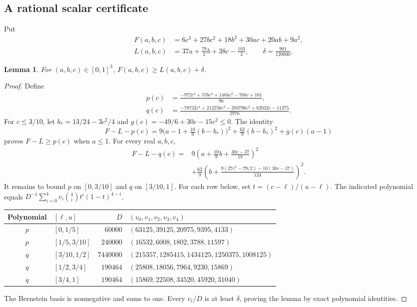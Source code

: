 \documentclass[11pt]{article}
\newtheorem{lemma}[theorem]{Lemma}
\theoremstyle{remark}
\begin{document}
\subsection{A rational scalar certificate}
Put
\begin{align*}
 F(a,b,c)&=6c^3+27bc^2+18b^2+30ac+20ab+9a^2,\\
 L(a,b,c)&=37a+\frac{79}{2}b+38c-\frac{103}{3},\qquad
 \delta=\frac{901}{120000}.
\end{align*}
\begin{lemma}\label{lem:minorant}
For $(a,b,c)\in[0,1]^3$, $F(a,b,c)\ge L(a,b,c)+\delta$.
\end{lemma}
\begin{proof}
Define
\begin{align*}
 p(c)&=\frac{-972c^4+576c^3+1404c^2-768c+101}{96},\\
 q(c)&=\frac{-78732c^4+212256c^3-203796c^2+82032c-11275}{2976}.
\end{align*}
For $c\le3/10$, let $b_*=13/24-3c^2/4$ and
$g(c)=-49/6+30c-15c^2\le0$. The identity
\[
 F-L-p(c)=9\bigl(a-1+\tfrac{10}{9}(b-b_*)\bigr)^2
       +\tfrac{62}{9}(b-b_*)^2+g(c)(a-1)
\]
proves $F-L\ge p(c)$ when $a\le1$. For every real $a,b,c$,
\begin{align*}
 F-L-q(c)={}&9\left(a+\tfrac{10}{9}b+\tfrac{30c-37}{18}\right)^2\\
 &+\frac{62}{9}\left(b+
 \frac{9(27c^2-79/2)-10(30c-37)}{124}\right)^2.
\end{align*}
It remains to bound $p$ on $[0,3/10]$ and $q$ on $[3/10,1]$.
For each row below, set $t=(c-\ell)/(u-\ell)$. The indicated polynomial
equals $D^{-1}\sum_{i=0}^4v_i\binom4i t^i(1-t)^{4-i}$.
\begin{center}\small
\begin{tabular}{clrl}
\toprule
Polynomial & $[\ell,u]$ & $D$ & $(v_0,v_1,v_2,v_3,v_4)$\\
\midrule
$p$ & $[0,1/5]$ & $60000$ & $(63125,39125,20975,9395,4133)$\\
$p$ & $[1/5,3/10]$ & $240000$ & $(16532,6008,1802,3788,11597)$\\
$q$ & $[3/10,1/2]$ & $7440000$ & $(215357,1285415,1434125,1250375,1008125)$\\
$q$ & $[1/2,3/4]$ & $190464$ & $(25808,18056,7964,9230,15869)$\\
$q$ & $[3/4,1]$ & $190464$ & $(15869,22508,34520,45920,31040)$\\
\bottomrule
\end{tabular}
\end{center}
The Bernstein basis is nonnegative and sums to one. Every $v_i/D$ is
at least $\delta$, proving the lemma by exact polynomial identities.
\end{proof}
\end{document}
